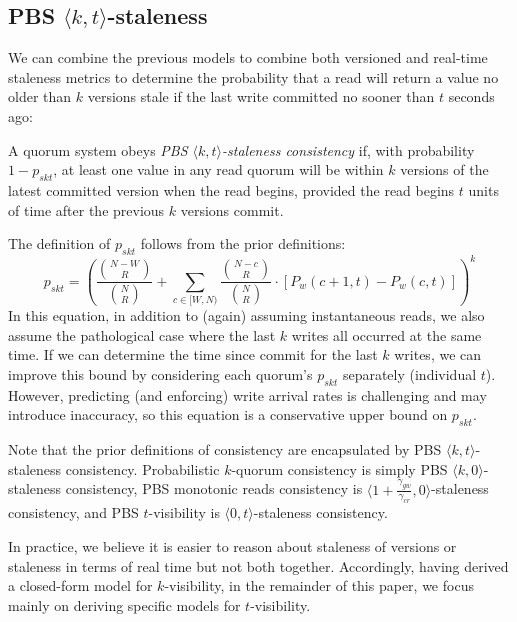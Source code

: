 \documentclass{vldb}
\newcommand{\subsectionskip}{-0em}
\begin{document}
\vspace{\subsectionskip}\subsection{PBS $\langle k, t \rangle$-staleness}

We can combine the previous models to combine both versioned and
real-time staleness metrics to determine the probability that a read
will return a value no older than $k$ versions stale if the last write
committed no sooner than $t$ seconds ago:
\begin{definition}
A quorum system obeys \textit{PBS $\langle k, t \rangle$-staleness
  consistency} if, with probability $1-p_{skt}$, at least one value in
any read quorum will be within $k$ versions of the latest committed
version when the read begins, provided the read begins $t$ units of
time after the previous $k$ versions commit.
\end{definition}
The definition of $p_{skt}$ follows from the prior definitions:
\begin{equation}
p_{skt} = (\frac{{N-W \choose R}}{{N \choose R}}+\sum_{c\in[W, N)} \frac{{N-c \choose R}}{{N \choose R}} \cdot [P_w(c+1, t)-P_w(c,t)])^k
\end{equation}
In this equation, in addition to (again) assuming instantaneous reads,
we also assume the pathological case where the last $k$ writes all
occurred at the same time.  If we can determine the time since commit
for the last $k$ writes, we can improve this bound by considering each
quorum's $p_{skt}$ separately (individual $t$).  However, predicting
(and enforcing) write arrival rates is challenging and may introduce
inaccuracy, so this equation is a conservative upper bound on
$p_{skt}$.

Note that the prior definitions of consistency are encapsulated by PBS
$\langle k, t \rangle$-staleness consistency. Probabilistic $k$-quorum
consistency is simply PBS $\langle k, 0 \rangle$-staleness consistency,
PBS monotonic reads consistency is $\langle
1+\frac{\gamma_{gw}}{\gamma_{cr}}, 0 \rangle$-staleness consistency, and
PBS $t$-visibility is $\langle 0, t \rangle$-staleness consistency.

In practice, we believe it is easier to reason about staleness of
versions or staleness in terms of real time but not both together.
Accordingly, having derived a closed-form model for $k$-visibility, in
the remainder of this paper, we focus mainly on deriving specific models
for $t$-visibility.
\end{document}
